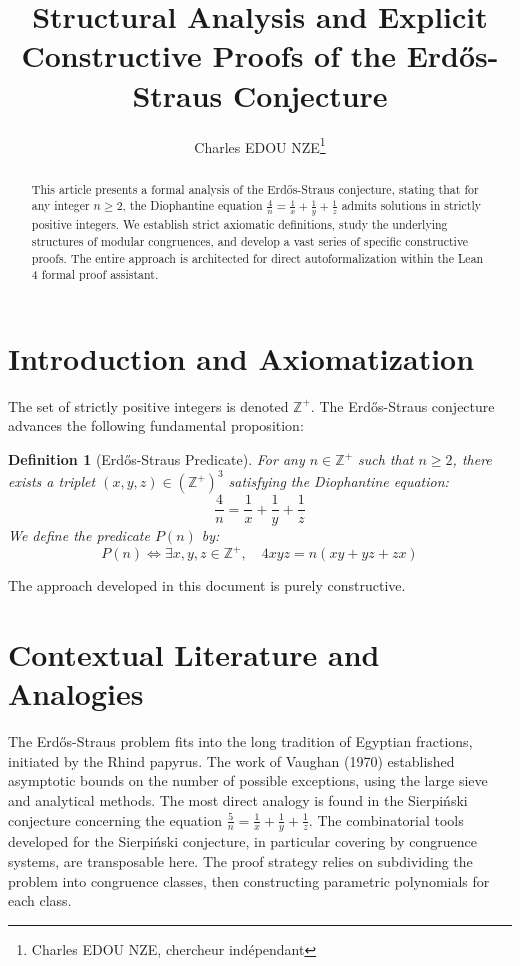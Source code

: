 \documentclass[11pt,a4paper]{article}
\title{Structural Analysis and Explicit Constructive Proofs of the Erd\H{o}s-Straus Conjecture}
\author{Charles EDOU NZE\thanks{Charles EDOU NZE, chercheur indépendant}}
\date{}
\newtheorem{definition}[theorem]{Definition}
\begin{document}
\maketitle

\begin{abstract}
This article presents a formal analysis of the Erd\H{o}s-Straus conjecture, stating that for any integer $n \geq 2$, the Diophantine equation $\frac{4}{n} = \frac{1}{x} + \frac{1}{y} + \frac{1}{z}$ admits solutions in strictly positive integers. We establish strict axiomatic definitions, study the underlying structures of modular congruences, and develop a vast series of specific constructive proofs. The entire approach is architected for direct autoformalization within the Lean 4 formal proof assistant.
\end{abstract}

\tableofcontents

\section{Introduction and Axiomatization}

The set of strictly positive integers is denoted $\mathbb{Z}^{+}$. The Erd\H{o}s-Straus conjecture advances the following fundamental proposition:

\begin{definition}[Erd\H{o}s-Straus Predicate]
For any $n \in \mathbb{Z}^{+}$ such that $n \geq 2$, there exists a triplet $(x, y, z) \in (\mathbb{Z}^{+})^3$ satisfying the Diophantine equation:
\begin{equation}
\frac{4}{n} = \frac{1}{x} + \frac{1}{y} + \frac{1}{z}
\label{eq:erdos}
\end{equation}
We define the predicate $P(n)$ by:
$$ P(n) \iff \exists x, y, z \in \mathbb{Z}^{+}, \quad 4xyz = n(xy + yz + zx) $$
\end{definition}

The approach developed in this document is purely constructive.

\section{Contextual Literature and Analogies}

The Erd\H{o}s-Straus problem fits into the long tradition of Egyptian fractions, initiated by the Rhind papyrus. The work of Vaughan (1970) established asymptotic bounds on the number of possible exceptions, using the large sieve and analytical methods. The most direct analogy is found in the Sierpi\'{n}ski conjecture concerning the equation $\frac{5}{n} = \frac{1}{x} + \frac{1}{y} + \frac{1}{z}$. The combinatorial tools developed for the Sierpi\'{n}ski conjecture, in particular covering by congruence systems, are transposable here. The proof strategy relies on subdividing the problem into congruence classes, then constructing parametric polynomials for each class.
\end{document}
